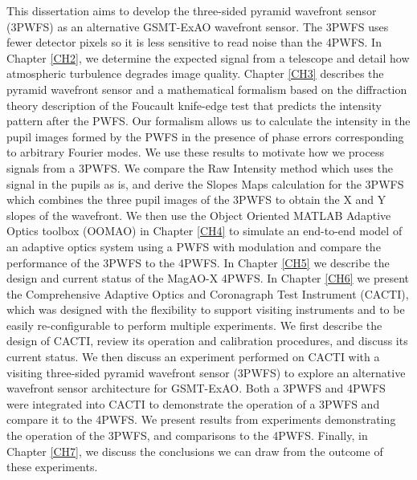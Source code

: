 This dissertation aims to develop the three-sided pyramid wavefront sensor (3PWFS) as an alternative GSMT-ExAO wavefront sensor. The 3PWFS  uses fewer detector pixels so it is less sensitive to read noise than the 4PWFS. In Chapter \ref{CH2}, we determine the expected signal from a telescope and detail how atmospheric turbulence degrades image quality. Chapter \ref{CH3} describes the pyramid wavefront sensor and a mathematical formalism based on the diffraction theory description of the Foucault knife-edge test that predicts the intensity pattern after the PWFS. Our formalism allows us to calculate the intensity in the pupil images formed by the PWFS in the presence of phase errors corresponding to arbitrary Fourier modes. We use these results to motivate how we process signals from a 3PWFS. We compare the Raw Intensity method which uses the signal in the pupils as is, and derive the Slopes Maps calculation for the 3PWFS which combines the three pupil images of the 3PWFS to obtain the X and Y slopes of the wavefront. We then use the Object Oriented MATLAB Adaptive Optics toolbox (OOMAO) in Chapter \ref{CH4} to simulate an end-to-end model of an adaptive optics system using a PWFS with modulation and compare the performance of the 3PWFS to the 4PWFS. In Chapter \ref{CH5} we describe the design and current status of the MagAO-X 4PWFS. In Chapter \ref{CH6} we present the Comprehensive Adaptive Optics and Coronagraph Test Instrument (CACTI), which was designed with the flexibility to support visiting instruments and to be easily re-configurable to perform multiple experiments. We first describe the design of CACTI, review its operation and calibration procedures, and discuss its current status. We then discuss an experiment performed on CACTI with a visiting three-sided pyramid wavefront sensor (3PWFS) to explore an alternative wavefront sensor architecture for GSMT-ExAO. Both a 3PWFS and 4PWFS were integrated into  CACTI to demonstrate the operation of a 3PWFS and compare it to the 4PWFS. We present results from experiments demonstrating the operation of the 3PWFS, and comparisons to the 4PWFS. Finally, in Chapter \ref{CH7}, we discuss the conclusions we can draw from the outcome of these experiments.












%  
%


